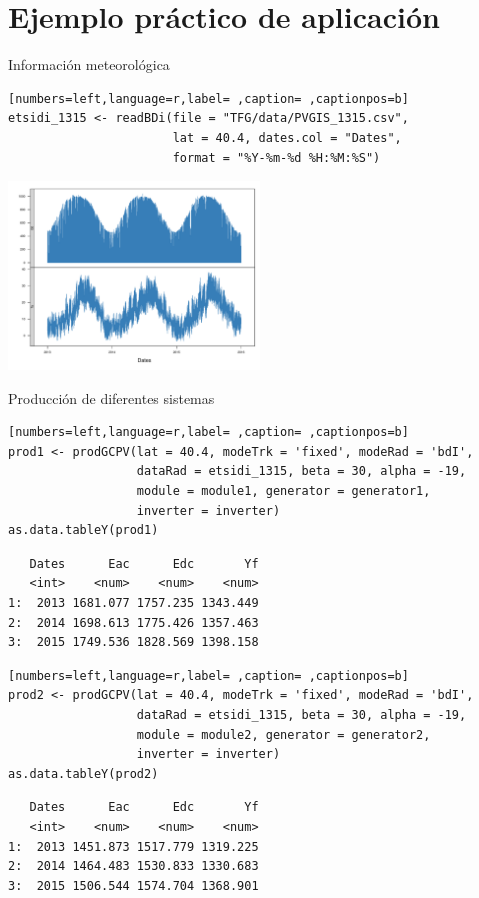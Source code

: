 \documentclass[aspectratio=169, usenames,svgnames,dvipsnames]{beamer}
\begin{document}
\section{Ejemplo práctico de aplicación}
\label{sec:org9ded387}
\begin{frame}[label={sec:org727d8f4},fragile]{Información meteorológica}
 \begin{lstlisting}[numbers=left,language=r,label= ,caption= ,captionpos=b]
etsidi_1315 <- readBDi(file = "TFG/data/PVGIS_1315.csv",
                       lat = 40.4, dates.col = "Dates",
                       format = "%Y-%m-%d %H:%M:%S")
\end{lstlisting}

\begin{center}
\includegraphics[width=0.5\textwidth]{../figuras/ejemplos3.pdf}
\end{center}
\end{frame}
\begin{frame}[label={sec:org1b48a96},fragile]{Producción de diferentes sistemas}
 \begin{lstlisting}[numbers=left,language=r,label= ,caption= ,captionpos=b]
prod1 <- prodGCPV(lat = 40.4, modeTrk = 'fixed', modeRad = 'bdI',
                  dataRad = etsidi_1315, beta = 30, alpha = -19,
                  module = module1, generator = generator1,
                  inverter = inverter)
as.data.tableY(prod1)
\end{lstlisting}

\begin{verbatim}
   Dates      Eac      Edc       Yf
   <int>    <num>    <num>    <num>
1:  2013 1681.077 1757.235 1343.449
2:  2014 1698.613 1775.426 1357.463
3:  2015 1749.536 1828.569 1398.158
\end{verbatim}


\begin{lstlisting}[numbers=left,language=r,label= ,caption= ,captionpos=b]
prod2 <- prodGCPV(lat = 40.4, modeTrk = 'fixed', modeRad = 'bdI',
                  dataRad = etsidi_1315, beta = 30, alpha = -19,
                  module = module2, generator = generator2,
                  inverter = inverter)
as.data.tableY(prod2)
\end{lstlisting}

\begin{verbatim}
   Dates      Eac      Edc       Yf
   <int>    <num>    <num>    <num>
1:  2013 1451.873 1517.779 1319.225
2:  2014 1464.483 1530.833 1330.683
3:  2015 1506.544 1574.704 1368.901
\end{verbatim}
\end{frame}
\end{document}
